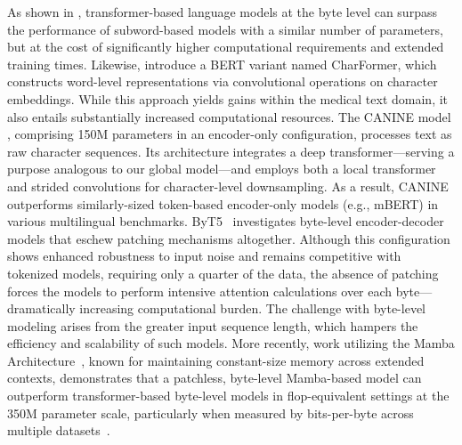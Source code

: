 As shown in \cite{Choe2019BridgingTG}, transformer-based language models at the byte level can surpass the performance of subword-based models with a similar number of parameters, but at the cost of significantly higher computational requirements and extended training times. Likewise, \cite{el2020characterbert} introduce a BERT variant named CharFormer, which constructs word-level representations via convolutional operations on character embeddings. While this approach yields gains within the medical text domain, it also entails substantially increased computational resources. The CANINE model \cite{clark2022canine}, comprising 150M parameters in an encoder-only configuration, processes text as raw character sequences. Its architecture integrates a deep transformer—serving a purpose analogous to our global model—and employs both a local transformer and strided convolutions for character-level downsampling. As a result, CANINE outperforms similarly-sized token-based encoder-only models (e.g., mBERT) in various multilingual benchmarks. ByT5~\citep{xue2022byt5} investigates byte-level encoder-decoder models that eschew patching mechanisms altogether. Although this configuration shows enhanced robustness to input noise and remains competitive with tokenized models, requiring only a quarter of the data, the absence of patching forces the models to perform intensive attention calculations over each byte—dramatically increasing computational burden. The challenge with byte-level modeling arises from the greater input sequence length, which hampers the efficiency and scalability of such models. More recently, work utilizing the Mamba Architecture~\citep{gu2023mamba}, known for maintaining constant-size memory across extended contexts, demonstrates that a patchless, byte-level Mamba-based model can outperform transformer-based byte-level models in flop-equivalent settings at the 350M parameter scale, particularly when measured by bits-per-byte across multiple datasets~\cite{wang2024mambabyte}.

